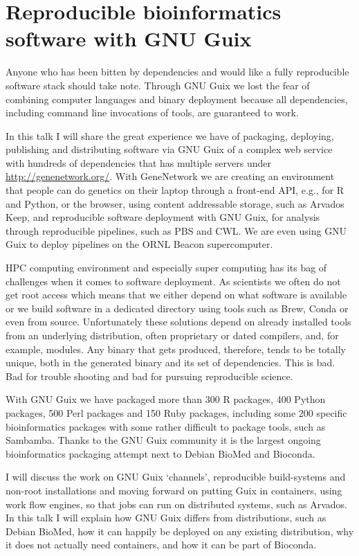 



\newcommand{\makeln}[1]{ \NOK & \moneyfont{#1} & \EUR & \convertit{#1}}




\section*{Reproducible bioinformatics software
with GNU Guix}

Anyone who has been bitten by dependencies and would like a fully
reproducible software stack should take note. Through GNU Guix we lost
the fear of combining computer languages and binary deployment because
all dependencies, including command line invocations of tools, are
guaranteed to work.

In this talk I will share the great experience we have of packaging,
deploying, publishing and distributing software via GNU Guix of a
complex web service with hundreds of dependencies that has multiple
servers under \hbox{\url{http://genenetwork.org/}}. With GeneNetwork
we are creating an environment that people can do genetics on their
laptop through a front-end API, e.g., for R and Python, or the
browser, using content addressable storage, such as Arvados Keep, and
reproducible software deployment with GNU Guix, for analysis through
reproducible pipelines, such as PBS and CWL. We are even using GNU
Guix to deploy pipelines on the ORNL Beacon supercomputer.

HPC computing environment and especially super computing has its bag
of challenges when it comes to software deployment. As scientists we
often do not get root access which means that we either depend on what
software is available or we build software in a dedicated directory
using tools such as Brew, Conda or even from source. Unfortunately
these solutions depend on already installed tools from an underlying
distribution, often proprietary or dated compilers, and, for example,
modules. Any binary that gets produced, therefore, tends to be totally
unique, both in the generated binary and its set of dependencies. This
is bad. Bad for trouble shooting and bad for pursuing reproducible
science.

With GNU Guix we have packaged more than 300 R packages, 400 Python
packages, 500 Perl packages and 150 Ruby packages, including some 200
specific bioinformatics packages with some rather difficult to package
tools, such as Sambamba. Thanks to the GNU Guix community it is the
largest ongoing bioinformatics packaging attempt next to Debian BioMed
and Bioconda.

I will discuss the work on GNU Guix `channels', reproducible
build-systems and non-root installations and moving forward on putting
Guix in containers, using work flow engines, so that jobs can run on
distributed systems, such as Arvados. In this talk I will explain how
GNU Guix differs from distributions, such as Debian BioMed, how it can
happily be deployed on any existing distribution, why it does not
actually need containers, and how it can be part of Bioconda.


